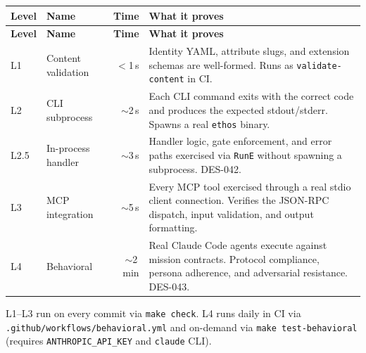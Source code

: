 \documentclass[a4paper,10pt]{article}
\newcommand{\cmd}[1]{\texttt{#1}}
\newcommand{\fpath}[1]{\texttt{#1}}
\begin{document}
\begin{center}
\begin{longtable}{@{}llrp{6cm}@{}}
\toprule
\textbf{Level} & \textbf{Name} & \textbf{Time} & \textbf{What it proves} \\
\midrule
\endfirsthead
\toprule
\textbf{Level} & \textbf{Name} & \textbf{Time} & \textbf{What it proves} \\
\midrule
\endhead
L1 & Content validation  & $<$1\,s   & Identity YAML, attribute slugs,
                                        and extension schemas are
                                        well-formed.  Runs as
                                        \cmd{validate-content} in CI. \\
L2 & CLI subprocess      & $\sim$2\,s & Each CLI command exits with the
                                        correct code and produces the
                                        expected stdout/stderr.  Spawns
                                        a real \cmd{ethos} binary. \\
L2.5 & In-process handler & $\sim$3\,s & Handler logic, gate
                                          enforcement, and error paths
                                          exercised via \texttt{RunE}
                                          without spawning a subprocess.
                                          DES-042. \\
L3 & MCP integration     & $\sim$5\,s & Every MCP tool exercised
                                        through a real stdio client
                                        connection.  Verifies the
                                        JSON-RPC dispatch, input
                                        validation, and output
                                        formatting. \\
L4 & Behavioral          & $\sim$2\,min & Real Claude Code agents
                                          execute against mission
                                          contracts.  Protocol
                                          compliance, persona
                                          adherence, and adversarial
                                          resistance.  DES-043. \\
\bottomrule
\end{longtable}
\end{center}

L1--L3 run on every commit via \cmd{make check}.  L4 runs daily in
CI via \fpath{.github/workflows/behavioral.yml} and on-demand via
\cmd{make test-behavioral} (requires \texttt{ANTHROPIC\_API\_KEY} and
\texttt{claude} CLI).
\end{document}
